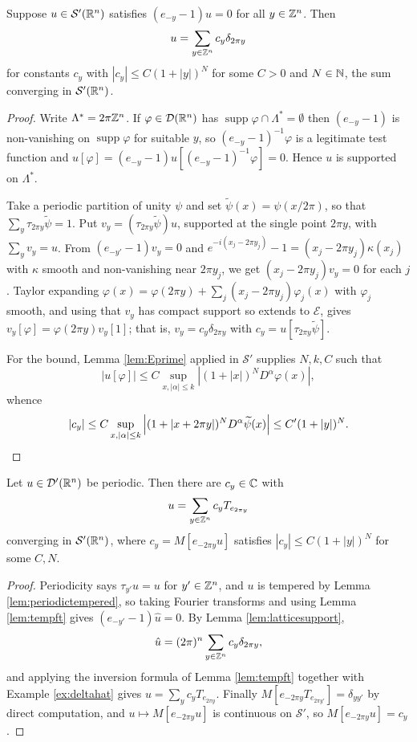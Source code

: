 \documentclass[a4paper]{scrartcl}
\newcommand{\wt}{\widetilde}
\newcommand{\Sch}{\mathcal{S}}
\newcommand{\Ecal}{\mathcal{E}}
\DeclareMathOperator{\supp}{supp}
\begin{document}
\begin{lemma}\label{lem:latticesupport}
	Suppose $u\in\Sch'(\R^n)$ satisfies $(e_{-y}-1)u=0$ for all $y\in\mathbb{Z}^n$. Then
	$$u=\sum_{y\in\mathbb{Z}^n}c_y\delta_{2\pi y}$$
	for constants $c_y$ with $|c_y|\le C(1+|y|)^N$ for some $C>0$ and $N\in\mathbb{N}$, the sum converging in $\Sch'(\R^n)$.
\end{lemma}

\begin{proof}
	Write $\Lambda^*=2\pi\mathbb{Z}^n$. If $\varphi\in\mathcal{D}(\mathbb{R}^n)$ has $\supp\varphi\cap\Lambda^*=\emptyset$ then $(e_{-y}-1)$ is non-vanishing on $\supp\varphi$ for suitable $y$, so $(e_{-y}-1)^{-1}\varphi$ is a legitimate test function and $u[\varphi]=(e_{-y}-1)u[(e_{-y}-1)^{-1}\varphi]=0$. Hence $u$ is supported on $\Lambda^*$.

	Take a periodic partition of unity $\psi$ and set $\wt\psi(x)=\psi(x/2\pi)$, so that $\sum_y\tau_{2\pi y}\wt\psi=1$. Put $v_y=(\tau_{2\pi y}\wt\psi)u$, supported at the single point $2\pi y$, with $\sum_yv_y=u$. From $(e_{-y'}-1)v_y=0$ and $e^{-i(x_j-2\pi y_j)}-1=(x_j-2\pi y_j)\kappa(x_j)$ with $\kappa$ smooth and non-vanishing near $2\pi y_j$, we get $(x_j-2\pi y_j)v_y=0$ for each $j$. Taylor expanding $\varphi(x)=\varphi(2\pi y)+\sum_j(x_j-2\pi y_j)\varphi_j(x)$ with $\varphi_j$ smooth, and using that $v_y$ has compact support so extends to $\Ecal$, gives $v_y[\varphi]=\varphi(2\pi y)v_y[1]$; that is, $v_y=c_y\delta_{2\pi y}$ with $c_y=u[\tau_{2\pi y}\wt\psi]$.

	For the bound, Lemma \ref{lem:Eprime} applied in $\Sch'$ supplies $N,k,C$ such that
	$$|u[\varphi]|\le C\sup_{x,|\alpha|\le k}\left|(1+|x|)^ND^\alpha\varphi(x)\right|,$$
	whence
	$$|c_y|\le C\sup_{x,|\alpha|\le k}\left|(1+|x+2\pi y|)^ND^\alpha\wt\psi(x)\right|\le C'(1+|y|)^N. \qedhere$$
\end{proof}

\begin{theorem}\label{thm:fourierseriesdist}
	Let $u\in\mathcal{D}'(\mathbb{R}^n)$ be periodic. Then there are $c_y \in \mathbb{C}$ with
	$$u = \sum_{y\in\mathbb{Z}^n}c_yT_{e_{2\pi y}}$$
	converging in $\Sch'(\R^n)$, where $c_y=M[e_{-2\pi y}u]$ satisfies $|c_y|\le C(1+|y|)^N$ for some $C, N$.
\end{theorem}

\begin{proof}
	Periodicity says $\tau_{y'}u=u$ for $y'\in\mathbb{Z}^n$, and $u$ is tempered by Lemma \ref{lem:periodictempered}, so taking Fourier transforms and using Lemma \ref{lem:tempft} gives $(e_{-y'}-1)\hat u=0$. By Lemma \ref{lem:latticesupport},
	$$\hat u = (2\pi)^n\sum_{y\in\mathbb{Z}^n}c_y\delta_{2\pi y},$$
	and applying the inversion formula of Lemma \ref{lem:tempft} together with Example \ref{ex:deltahat} gives $u=\sum_yc_yT_{e_{2\pi y}}$. Finally $M[e_{-2\pi y}T_{e_{2\pi y'}}]=\delta_{yy'}$ by direct computation, and $u\mapsto M[e_{-2\pi y}u]$ is continuous on $\Sch'$, so $M[e_{-2\pi y}u]=c_y$.
\end{proof}
\end{document}
